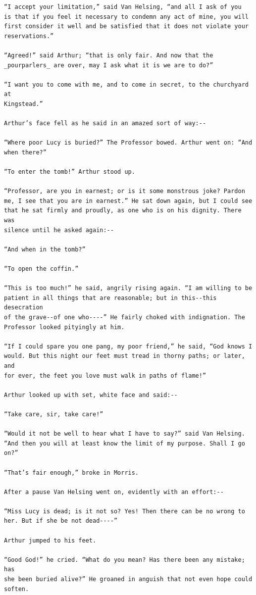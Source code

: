 \documentclass{article}
\begin{document}
\begin{verbatim}
“I accept your limitation,” said Van Helsing, “and all I ask of you
is that if you feel it necessary to condemn any act of mine, you will
first consider it well and be satisfied that it does not violate your
reservations.”

“Agreed!” said Arthur; “that is only fair. And now that the
_pourparlers_ are over, may I ask what it is we are to do?”

“I want you to come with me, and to come in secret, to the churchyard at
Kingstead.”

Arthur’s face fell as he said in an amazed sort of way:--

“Where poor Lucy is buried?” The Professor bowed. Arthur went on: “And
when there?”

“To enter the tomb!” Arthur stood up.

“Professor, are you in earnest; or is it some monstrous joke? Pardon
me, I see that you are in earnest.” He sat down again, but I could see
that he sat firmly and proudly, as one who is on his dignity. There was
silence until he asked again:--

“And when in the tomb?”

“To open the coffin.”

“This is too much!” he said, angrily rising again. “I am willing to be
patient in all things that are reasonable; but in this--this desecration
of the grave--of one who----” He fairly choked with indignation. The
Professor looked pityingly at him.

“If I could spare you one pang, my poor friend,” he said, “God knows I
would. But this night our feet must tread in thorny paths; or later, and
for ever, the feet you love must walk in paths of flame!”

Arthur looked up with set, white face and said:--

“Take care, sir, take care!”

“Would it not be well to hear what I have to say?” said Van Helsing.
“And then you will at least know the limit of my purpose. Shall I go
on?”

“That’s fair enough,” broke in Morris.

After a pause Van Helsing went on, evidently with an effort:--

“Miss Lucy is dead; is it not so? Yes! Then there can be no wrong to
her. But if she be not dead----”

Arthur jumped to his feet.

“Good God!” he cried. “What do you mean? Has there been any mistake; has
she been buried alive?” He groaned in anguish that not even hope could
soften.


\end{verbatim}
\end{document}
